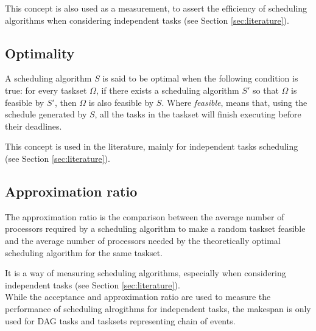 This concept is also used as a measurement, to assert the efficiency
of scheduling algorithms when considering independent tasks (see Section \ref{sec:literature}).

\subsection{Optimality}

A scheduling algorithm $S$ is said to be optimal 
when the following condition is true:
for every taskset $\Omega$, if there exists 
a scheduling algorithm $S'$ so that $\Omega$ is feasible by $S'$,
then $\Omega$ is also feasible by $S$.
Where {\it{feasible}}, 
means that, using the schedule generated by $S$,
all the tasks in the taskset will finish executing before their deadlines.

This concept is used in the literature, mainly for independent tasks scheduling
(see Section \ref{sec:literature}).

\subsection{Approximation ratio}

The approximation ratio is the comparison between 
the average number of processors required by a scheduling algorithm 
to make a random taskset feasible and the average number of 
processors needed by the theoretically optimal scheduling algorithm 
for the same taskset.

It is a way of measuring scheduling algorithms,
especially when considering independent tasks (see Section \ref{sec:literature}).
\\


While the acceptance and approximation ratio are used 
to measure the performance of scheduling alrogithms for independent tasks,
the makespan is only used for DAG tasks and tasksets representing chain of events.